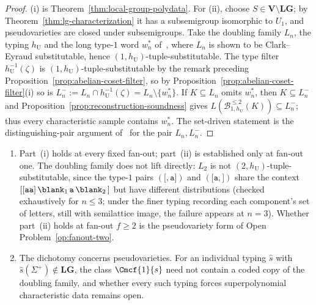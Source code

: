 \begin{proof}
(i) is Theorem~\ref{thm:local-group-polydata}.  For (ii), choose
$S\in\mathbf V\setminus\mathbf{LG}$; by
Theorem~\ref{thm:lg-characterization} it has a subsemigroup isomorphic to
$U_1$, and pseudovarieties are closed under subsemigroups.  Take the doubling
family $L_n$, the typing $h_{\mathrm U}$ and the long type-$1$ word $w_n^*$
of~\cite[Proposition~6.4]{kuriyamaCFG}, where $L_n$ is shown to be
Clark--Eyraud substitutable, hence $(1,h_{\mathrm U})$-tuple-substitutable.
The type filter $h_{\mathrm U}^{-1}(\zeta)$ is
$(1,h_{\mathrm U})$-tuple-substitutable by the remark preceding
Proposition~\ref{prop:abelian-coset-filter},
so by Proposition~\ref{prop:abelian-coset-filter}(i) so is
$L_n^-:=L_n\cap h_{\mathrm U}^{-1}(\zeta)=L_n\setminus\{w_n^*\}$.  If
$K\subseteq L_n$ omits $w_n^*$, then $K\subseteq L_n^-$ and
Proposition~\ref{prop:reconstruction-soundness} gives
$L(\mathcal B^{\le2}_{1,h_{\mathrm U}}(K))\subseteq L_n^-$; thus every
characteristic sample contains $w_n^*$.  The set-driven statement is the
distinguishing-pair argument of~\cite[Proposition~6.4(iv)]{kuriyamaCFG} for
the pair $L_n,L_n^-$.
\end{proof}

\begin{remark}
\label{rem:dichotomy-scope}
\begin{enumerate}[label=\textup{(\roman*)},leftmargin=*]
\item Part~(i) holds at every fixed fan-out; part~(ii) is established only at
fan-out one.  The doubling family does not lift directly: $L_2$ is not
$(2,h_{\mathrm U})$-tuple-substitutable, since the type-$1$ pairs
$(\mathtt[,\mathtt a\mathtt])$ and $(\mathtt[\mathtt a,\mathtt])$ share the
context $\mathtt{[[aa]}\,\blank_1\,\mathtt a\,\blank_2\,\mathtt]$ but have
different distributions (checked exhaustively for $n\le3$; under the finer
typing recording each component's set of letters, still with semilattice image,
the failure appears at $n=3$).  Whether part~(ii) holds at fan-out $f\ge2$ is
the pseudovariety form of Open Problem~\ref{op:fanout-two}.
\item The dichotomy concerns pseudovarieties.  For an individual typing $\widehat{s}$
with $\widehat{s}(\Sigma^+)\notin\mathbf{LG}$, the class $\Cmcf{1}{s}$ need not contain
a coded copy of the doubling family, and whether every such typing forces
superpolynomial characteristic data remains open.
\end{enumerate}
\end{remark}
